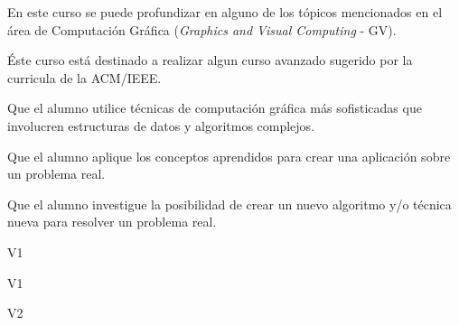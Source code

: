 \begin{syllabus}


\begin{justification}
En este curso se puede profundizar en alguno de los tópicos
mencionados en el área de Computación Gráfica (\textit{Graphics and Visual
Computing} - GV).

Éste curso está destinado a realizar algun curso avanzado sugerido por la curricula de la ACM/IEEE. \cite{Foley13,Hearn90}
\end{justification}

\begin{goals}
\item Que el alumno utilice técnicas de computación gráfica más sofisticadas que involucren estructuras de datos y algoritmos complejos.
\item Que el alumno aplique los conceptos aprendidos para crear una aplicación sobre un problema real.
\item Que el alumno investigue la posibilidad de crear un nuevo algoritmo y/o técnica nueva para resolver un problema real.
\end{goals}

\begin{outcomes}{V1}
    \item {}
    \item {}
    \item {}
\end{outcomes}

\begin{specificoutcomes}{V1}
    \item {}
    \item {}
    \item {}
\end{specificoutcomes}

\begin{outcomes}{V2}
    \item {}
    \item {}
    \item {}
    \item {}
\end{outcomes}


\end{syllabus}
